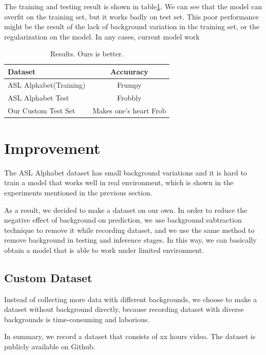 \documentclass[10pt,twocolumn,letterpaper]{article}
\begin{document}
The training and testing result is shown in table\ref{table:result}. We can see   that the model can overfit on the training set, but it works badly on test set. This poor performance might be the result of the lack of background variation in the training set, or the regularization on the model. In any cases, current model work 

\begin{table}[h]
\begin{center}
\begin{tabular}{|l|c|}
\hline
Dataset & Accuuracy \\
\hline\hline
ASL Alphabet(Training) & Frumpy \\
ASL Alphabet Test & Frobbly \\
Our Custom Test Set & Makes one's heart Frob\\
\hline
\end{tabular}
\end{center}
\caption{Results.   Ours is better.}
\label{table:result}
\end{table}

\section{Improvement}

The ASL Alphabet dataset has small background variations and it is hard to train a model that works well in real environment, which is shown in the experiments mentioned in the previous section.

As a result, we decided to make a dataset on our own. In order to reduce the negative effect of background on prediction, we use background subtraction technique to remove it while recording dataset, and we use the same method to remove background in testing and inference stages. In this way, we can basically obtain a model that is able to work under limited environment.

\subsection{Custom Dataset}

Instead of collecting more data with different backgrounds, we choose to make a dataset without background directly, because recording dataset with diverse backgrounds is time-consuming and laborious.

In summary, we record a dataset that consists of xx hours video. The dataset is publicly available on Github.
\end{document}
